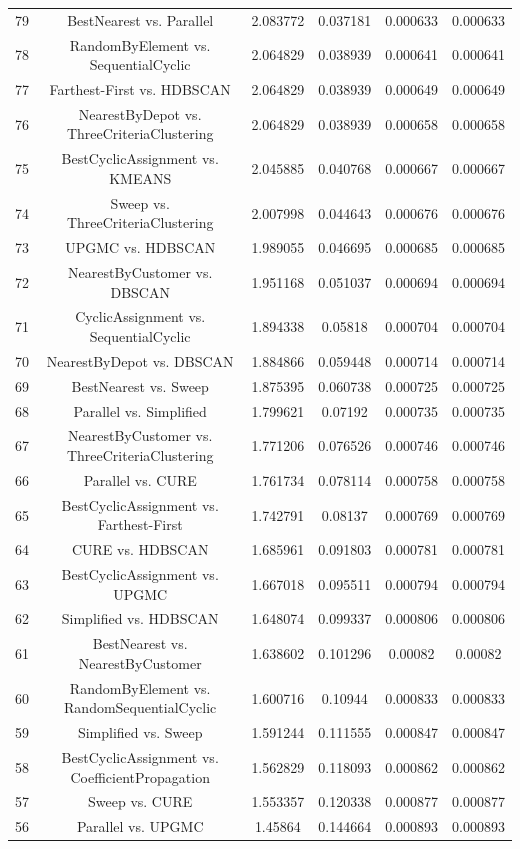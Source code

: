 \documentclass[a4paper,10pt]{article}
\begin{document}
\begin{landscape}
\begin{table}[!htp]
\begin{tabular}{cccccc}
79&BestNearest vs. Parallel&2.083772&0.037181&0.000633&0.000633\\
78&RandomByElement vs. SequentialCyclic&2.064829&0.038939&0.000641&0.000641\\
77&Farthest-First vs. HDBSCAN&2.064829&0.038939&0.000649&0.000649\\
76&NearestByDepot vs. ThreeCriteriaClustering&2.064829&0.038939&0.000658&0.000658\\
75&BestCyclicAssignment vs. KMEANS&2.045885&0.040768&0.000667&0.000667\\
74&Sweep vs. ThreeCriteriaClustering&2.007998&0.044643&0.000676&0.000676\\
73&UPGMC vs. HDBSCAN&1.989055&0.046695&0.000685&0.000685\\
72&NearestByCustomer vs. DBSCAN&1.951168&0.051037&0.000694&0.000694\\
71&CyclicAssignment vs. SequentialCyclic&1.894338&0.05818&0.000704&0.000704\\
70&NearestByDepot vs. DBSCAN&1.884866&0.059448&0.000714&0.000714\\
69&BestNearest vs. Sweep&1.875395&0.060738&0.000725&0.000725\\
68&Parallel vs. Simplified&1.799621&0.07192&0.000735&0.000735\\
67&NearestByCustomer vs. ThreeCriteriaClustering&1.771206&0.076526&0.000746&0.000746\\
66&Parallel vs. CURE&1.761734&0.078114&0.000758&0.000758\\
65&BestCyclicAssignment vs. Farthest-First&1.742791&0.08137&0.000769&0.000769\\
64&CURE vs. HDBSCAN&1.685961&0.091803&0.000781&0.000781\\
63&BestCyclicAssignment vs. UPGMC&1.667018&0.095511&0.000794&0.000794\\
62&Simplified vs. HDBSCAN&1.648074&0.099337&0.000806&0.000806\\
61&BestNearest vs. NearestByCustomer&1.638602&0.101296&0.00082&0.00082\\
60&RandomByElement vs. RandomSequentialCyclic&1.600716&0.10944&0.000833&0.000833\\
59&Simplified vs. Sweep&1.591244&0.111555&0.000847&0.000847\\
58&BestCyclicAssignment vs. CoefficientPropagation&1.562829&0.118093&0.000862&0.000862\\
57&Sweep vs. CURE&1.553357&0.120338&0.000877&0.000877\\
56&Parallel vs. UPGMC&1.45864&0.144664&0.000893&0.000893\\

\end{tabular}
\end{table}
\end{landscape}
\end{document}
